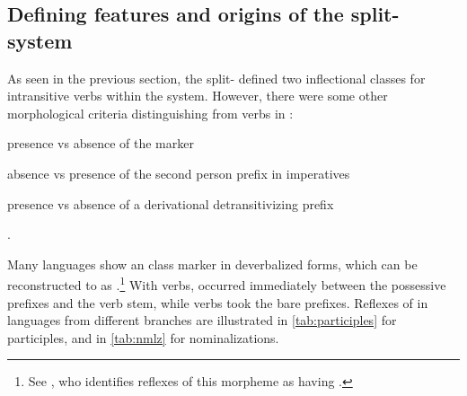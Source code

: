 \subsection{Defining features and origins of the split- system}
\label{sec:split}
As seen in the previous section, the split- defined two inflectional classes for intransitive verbs within the \setone system.
%
%
However, there were some other morphological criteria distinguishing  from  verbs in \PC:
\begin{inlinelist}
\item presence vs absence of the  marker 
\item absence vs presence of the second person prefix  in imperatives
\item presence vs absence of a derivational detransitivizing prefix
\end{inlinelist}.

Many languages show an  class marker in deverbalized forms, which can be reconstructed to \PC as .\footnote{See \textcite[227]{meira2000split}, who identifies reflexes of this morpheme as having .}
With  verbs,  occurred immediately between the possessive prefixes and the verb stem, while  verbs took the bare prefixes.
Reflexes of  in languages from different branches are illustrated in \cref{tab:participles} for participles, and in \cref{tab:nmlz} for nominalizations.

